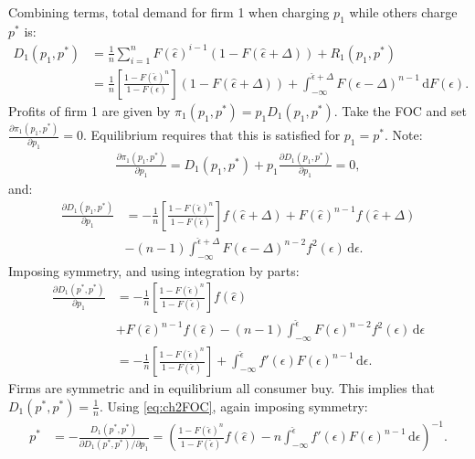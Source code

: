 \documentclass[12pt]{article}
\numberwithin{equation}{section}
\renewcommand{\d}[1]{\,\textrm{d}#1}
\newcommand{\1}[1]{\,\mathbbm{1}_{#1}} %
\begin{document}
Combining terms, total demand for firm 1 when charging $p_1$ while others
charge $p^*$ is:
\begin{align}
	D_1(p_1,p^*) & =\frac{1}{n}\sum_{i=1}^nF(\hat\epsilon)^{i-1}
	(1-F(\hat\epsilon+\Delta))+R_1(p_1,p^*)                      \\
	             & =\frac{1}{n}\left[
	\frac{1-F(\hat\epsilon)^n}{1-F(\epsilon)}\right]
	(1-F(\hat\epsilon+\Delta))+
	\int_{-\infty}^{\hat\epsilon+\Delta}
	F(\epsilon-\Delta)^{n-1}\d F(\epsilon).
\end{align}
Profits of firm 1 are given by $\pi_1(p_1,p^*)=p_1D_1(p_1,p^*)$. Take the
FOC and set $\frac{\partial\pi_1(p_1,p^*)}{\partial p_1}=0$. Equilibrium
requires that this is satisfied for $p_1=p^*$. Note:
\begin{align}
	\frac{\partial\pi_1(p_1,p^*)}{\partial p_1}=D_1(p_1,p^*)+
	p_1\frac{\partial D_1(p_1,p^*)}{\partial p_1}=0,
	\label{eq:ch2FOC}
\end{align}
and:
\begin{align}
	\frac{\partial D_1(p_1,p^*)}{\partial p_1} & =
	-\frac{1}{n}\left[\frac{1-F(\hat\epsilon)^n}{1-F(\hat\epsilon)}\right]
	f(\hat\epsilon+\Delta)+F(\hat\epsilon)^{n-1}f(\hat\epsilon+\Delta)                      \\
	                                           & -(n-1)\int_{-\infty}^{\hat\epsilon+\Delta}
	F(\epsilon-\Delta)^{n-2}f^2(\epsilon)\d\epsilon.
\end{align}
Imposing symmetry, and using integration by parts:
\begin{align}
	\frac{\partial D_1(p^*,p^*)}{\partial p_1} & =
	-\frac{1}{n}\left[\frac{1-F(\hat\epsilon)^n}{1-F(\hat\epsilon)}\right]
	f(\hat\epsilon)                                \\
	                                           & +
	F(\hat\epsilon)^{n-1}f(\hat\epsilon)
	-(n-1)\int_{-\infty}^{\hat\epsilon}
	F(\epsilon)^{n-2}f^2(\epsilon)\d\epsilon       \\
	                                           & =
	-\frac{1}{n}\left[\frac{1-F(\hat\epsilon)^n}{1-F(\hat\epsilon)}\right]+
	\int_{-\infty}^{\hat\epsilon}f'(\epsilon)F(\epsilon)^{n-1}\d\epsilon.
\end{align}
Firms are symmetric and in equilibrium all consumer buy. This implies
that $D_1(p^*,p^*)=\frac{1}{n}$. Using \ref{eq:ch2FOC}, again imposing
symmetry:
\begin{align}
	p^* & =-\frac{D_1(p^*,p^*)}{\partial D_1(p^*,p^*)/\partial p_1}
	=\left(
	\frac{1-F(\hat\epsilon)^n}{1-F(\hat\epsilon)}f(\hat\epsilon)
	-n\int_{-\infty}^{\hat\epsilon}f'(\epsilon)F(\epsilon)^{n-1}\d\epsilon
	\right)^{-1}.
\end{align}
\end{document}

